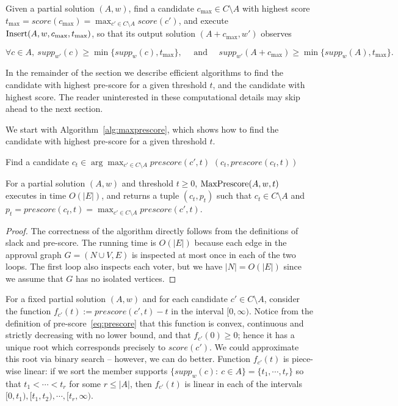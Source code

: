 \begin{heuristic}
Given a partial solution $(A,w)$, find a candidate $c_{\max}\in C\setminus A$ with highest score $t_{\max}=score(c_{\max})=\max_{c'\in C\setminus A} score(c')$, and execute $\operatorname{Insert}(A,w,c_{\max},t_{\max})$, so that its output solution $(A+c_{\max},w')$ observes 

$$\forall c\in A, \ supp_{w'}(c)\geq \min\{supp_w(c), t_{\max}\}, \quad \text{ and } \quad supp_{w'}(A+c_{\max})\geq \min \Big\{ supp_w(A), t_{\max}\Big\}.$$
\end{heuristic}

In the remainder of the section we describe efficient algorithms to find the candidate with highest pre-score for a given threshold $t$, and the candidate with highest score. The reader uninterested in these computational details may skip ahead to the next section.

We start with Algorithm~\ref{alg:maxprescore}, which shows how to find the candidate with highest pre-score for a given threshold $t$.

\begin{algorithm}[htb]\label{alg:maxprescore}
\SetAlgoLined
{}
Find a candidate $c_t\in\arg\max_{c'\in C\setminus A} prescore(c', t)$\;
\Return $(c_t, prescore(c_t, t))$\;
 \caption{$\maxprescore(A,w,t)$}
\end{algorithm}

\begin{lemma}
For a partial solution $(A,w)$ and threshold $t\geq 0$, $\maxprescore(A,w,t)$ executes in time $O(|E|)$, 
and returns a tuple $(c_t,p_t)$ such that $c_t\in C\setminus A$ 
and $p_t=prescore(c_t,t)=\max_{c'\in C\setminus A} prescore(c',t)$.
\end{lemma}

\begin{proof}
The correctness of the algorithm directly follows from the definitions of slack and pre-score. The running time is $O(|E|)$ because each edge in the approval graph $G=(N\cup V, E)$ is inspected at most once in each of the two loops. The first loop also inspects each voter, but we have $|N|=O(|E|)$ since we assume that $G$ has no isolated vertices.
\end{proof}


For a fixed partial solution $(A,w)$ and for each candidate $c'\in C\setminus A$, consider the function 
$f_{c'}(t):=prescore(c',t)-t$ in the interval $[0,\infty)$. 
Notice from the definition of pre-score~\eqref{eq:prescore} that this function is convex, continuous and strictly decreasing with no lower bound, and that $f_{c'}(0)\geq 0$; hence it has a unique root which corresponds precisely to $score(c')$. We could approximate this root via binary search -- however, we can do better. 
Function $f_{c'}(t)$ is piece-wise linear: if we sort the member supports $\{supp_w(c): \ c\in A\}=\{t_1, \cdots, t_r\}$ so that $t_1 < \cdots < t_r$ for some $r\leq |A|$, then $f_{c'}(t)$ is linear in each of the intervals $[0, t_1), [t_1, t_2), \cdots, [t_r, \infty)$.

